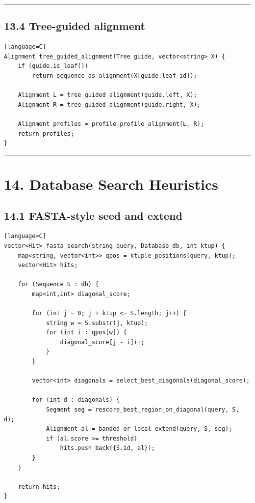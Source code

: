 \documentclass[11pt]{article}
\begin{document}
\begin{center}\rule{0.5\linewidth}{0.5pt}\end{center}

\subsection{13.4 Tree-guided alignment}\label{tree-guided-alignment}

\begin{verbatim}[language=C]
Alignment tree_guided_alignment(Tree guide, vector<string> X) {
    if (guide.is_leaf())
        return sequence_as_alignment(X[guide.leaf_id]);

    Alignment L = tree_guided_alignment(guide.left, X);
    Alignment R = tree_guided_alignment(guide.right, X);

    Alignment profiles = profile_profile_alignment(L, R);
    return profiles;
}
\end{verbatim}

\begin{center}\rule{0.5\linewidth}{0.5pt}\end{center}

\section{14. Database Search Heuristics}\label{database-search-heuristics}

\subsection{14.1 FASTA-style seed and extend}\label{fasta-style-seed-and-extend}

\begin{verbatim}[language=C]
vector<Hit> fasta_search(string query, Database db, int ktup) {
    map<string, vector<int>> qpos = ktuple_positions(query, ktup);
    vector<Hit> hits;

    for (Sequence S : db) {
        map<int,int> diagonal_score;

        for (int j = 0; j + ktup <= S.length; j++) {
            string w = S.substr(j, ktup);
            for (int i : qpos[w]) {
                diagonal_score[j - i]++;
            }
        }

        vector<int> diagonals = select_best_diagonals(diagonal_score);

        for (int d : diagonals) {
            Segment seg = rescore_best_region_on_diagonal(query, S, d);
            Alignment al = banded_or_local_extend(query, S, seg);
            if (al.score >= threshold)
                hits.push_back({S.id, al});
        }
    }

    return hits;
}
\end{verbatim}
\end{document}
